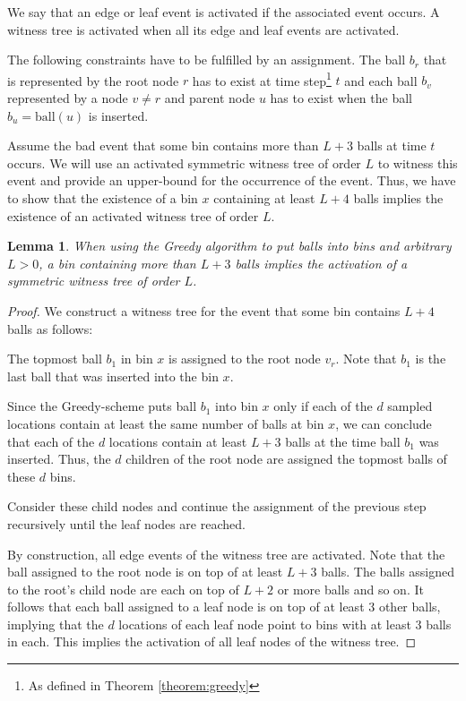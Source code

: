 \documentclass[a4paper,12pt]{article}
\newtheorem{lemma}{Lemma}
\begin{document}
We say that an edge or leaf event is activated if the associated event occurs. A witness tree is activated when all its edge and leaf events are activated. 

The following constraints have to be fulfilled by an assignment. The ball $b_r$ that is represented by the root node $r$ has to exist at time step\footnote{As defined in Theorem \ref{theorem:greedy}} $t$ and each ball $b_v$ represented by a node $v \neq r$ and parent node $u$ has to exist when the ball $b_u = \mathrm{ball}(u)$ is inserted.

Assume the bad event that some bin contains more than $L+3$ balls at time $t$ occurs. We will use an activated symmetric witness tree of order $L$ to witness this event and provide an upper-bound for the occurrence of the event. Thus, we have to show that the existence of a bin $x$ containing at least $L+4$ balls implies the existence of an activated witness tree of order $L$. 

\begin{lemma}
When using the Greedy algorithm to put balls into bins and arbitrary $L > 0$, a bin containing more than $L+3$ balls implies the activation of a symmetric witness tree of order $L$.
\end{lemma}

\begin{proof}
We construct a witness tree for the event that some bin contains $L+4$ balls as follows:
\begin{compactenum}
\item The topmost ball $b_1$ in bin $x$ is assigned to the root node $v_r$. Note that $b_1$ is the last ball that was inserted into the bin $x$.
\item Since the Greedy-scheme puts ball $b_1$ into bin $x$ only if each of the $d$ sampled locations contain at least the same number of balls at bin $x$, we can conclude that each of the $d$ locations contain at least $L+3$ balls at the time ball $b_1$ was inserted. Thus, the $d$ children of the root node are assigned the topmost balls of these $d$ bins.
\item Consider these child nodes and continue the assignment of the previous step recursively until the leaf nodes are reached.  
\end{compactenum}

By construction, all edge events of the witness tree are activated. Note that the ball assigned to the root node is on top of at least $L+3$ balls. The balls assigned to the root's child node are each on top of $L+2$ or more balls and so on. It follows that each ball assigned to a leaf node is on top of at least 3 other balls, implying that the $d$ locations of each leaf node point to bins with at least 3 balls in each. This implies the activation of all leaf nodes of the witness tree.
\end{proof}
\end{document}
